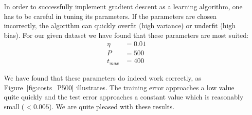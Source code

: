 In order to successfully implement gradient descent as a learning algorithm, one has to be careful in tuning its parameters. 
If the parameters are chosen incorrectly, the algorithm can quickly overfit (high variance) or underfit (high bias).
For our given dataset we have found that these parameters are most suited:
\begin{align*}
\eta &= 0.01 \\
P &= 500 \\
t_{max} &= 400
\end{align*}

We have found that these parameters do indeed work correctly, as Figure~\ref{fig:costs_P500} illustrates. 
The training error approaches a low value quite quickly and the test error approaches a constant value which is reasonably small (\(< 0.005\)).
We are quite pleased with these results.